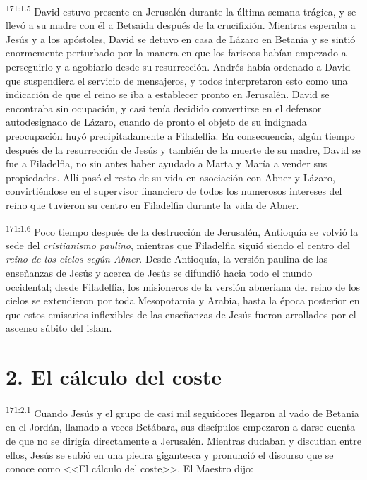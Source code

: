 \par 
\textsuperscript{171:1.5} David estuvo presente en Jerusalén durante la última semana trágica, y se llevó a su madre con él a Betsaida después de la crucifixión. Mientras esperaba a Jesús y a los apóstoles, David se detuvo en casa de Lázaro en Betania y se sintió enormemente perturbado por la manera en que los fariseos habían empezado a perseguirlo y a agobiarlo desde su resurrección. Andrés había ordenado a David que suspendiera el servicio de mensajeros, y todos interpretaron esto como una indicación de que el reino se iba a establecer pronto en Jerusalén. David se encontraba sin ocupación, y casi tenía decidido convertirse en el defensor autodesignado de Lázaro, cuando de pronto el objeto de su indignada preocupación huyó precipitadamente a Filadelfia. En consecuencia, algún tiempo después de la resurrección de Jesús y también de la muerte de su madre, David se fue a Filadelfia, no sin antes haber ayudado a Marta y María a vender sus propiedades. Allí pasó el resto de su vida en asociación con Abner y Lázaro, convirtiéndose en el supervisor financiero de todos los numerosos intereses del reino que tuvieron su centro en Filadelfia durante la vida de Abner.

\par 
\textsuperscript{171:1.6} Poco tiempo después de la destrucción de Jerusalén, Antioquía se volvió la sede del \textit{cristianismo paulino}, mientras que Filadelfia siguió siendo el centro del \textit{reino de los cielos según Abner}. Desde Antioquía, la versión paulina de las enseñanzas de Jesús y acerca de Jesús se difundió hacia todo el mundo occidental; desde Filadelfia, los misioneros de la versión abneriana del reino de los cielos se extendieron por toda Mesopotamia y Arabia, hasta la época posterior en que estos emisarios inflexibles de las enseñanzas de Jesús fueron arrollados por el ascenso súbito del islam.

\section*{2. El cálculo del coste}
\par 
\textsuperscript{171:2.1} Cuando Jesús y el grupo de casi mil seguidores llegaron al vado de Betania en el Jordán, llamado a veces Betábara, sus discípulos empezaron a darse cuenta de que no se dirigía directamente a Jerusalén. Mientras dudaban y discutían entre ellos, Jesús se subió en una piedra gigantesca y pronunció el discurso que se conoce como <<El cálculo del coste>>. El Maestro dijo:

